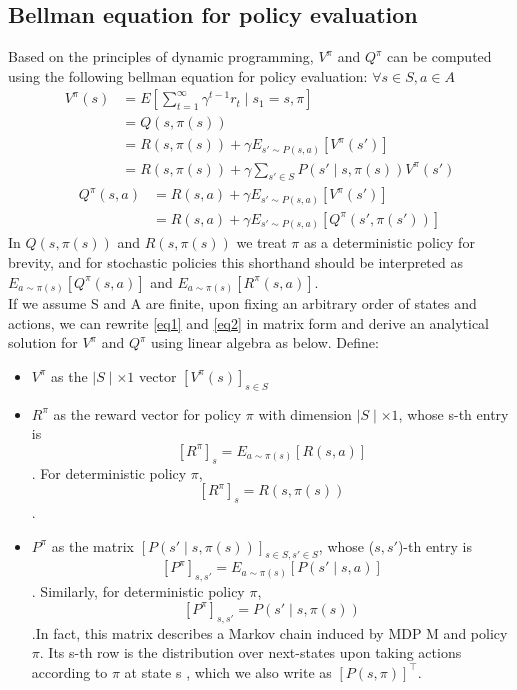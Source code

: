\documentclass{report}
\begin{document}
\subsection{Bellman equation for policy evaluation}
Based on the principles of dynamic programming, $V^{\pi}$ and $Q^{\pi}$ can be computed using the following bellman equation for policy evaluation: $\forall s\in S, a \in A$
\begin{equation} \label{eq1}
\begin{split}
V^{\pi}(s) & = E[\sum_{t=1}^{\infty}\gamma^{t-1}r_t \mid s_1=s,\pi] \\
          & = Q(s, \pi(s)) \\ 
          & = R(s,\pi(s))+\gamma E_{s' \sim P(s,a)}[V^{\pi}(s')] \\
          & = R(s,\pi(s))+\gamma \sum_{s'\in S}P(s' \mid s,\pi(s))V^{\pi}(s') 
\end{split}
\end{equation}
\begin{equation} \label{eq2}
\begin{split}
    Q^{\pi}(s,a) & = R(s,a)+\gamma E_{s'\sim P(s,a)}[V^{\pi}(s')] \\
                & =  R(s,a)+\gamma E_{s'\sim P(s,a)}[Q^{\pi}(s', \pi(s'))]           
\end{split}
\end{equation}
In $Q(s, \pi(s))$ and $R(s,\pi(s))$ we treat $\pi$ as a deterministic policy for brevity, and for stochastic policies this shorthand should be interpreted as $E_{a\sim\pi(s)}[Q^{\pi}(s,a)]$ and $E_{a\sim\pi(s)}[R^{\pi}(s,a)]$.\\
If we assume S and A are finite, upon fixing an arbitrary order of states and actions, we can rewrite \ref{eq1} and \ref{eq2} in matrix form and derive an analytical solution for $V^{\pi}$ and $Q^{\pi}$ using linear algebra as below. Define:
\begin{itemize}
    \item $V^{\pi}$ as the $\mid S\mid \times 1$ vector $[V^{\pi}(s)]_{s\in S}$
    \item $R^{\pi}$ as the reward vector for policy $\pi$ with dimension $\mid S \mid \times 1$, whose s-th entry is \[[R^{\pi}]_s=E_{a\sim\pi(s)}[R(s,a)]\]. For deterministic policy $\pi$, \[
        [R^{\pi}]_s=R(s,\pi(s))
    \].
    \item $P^{\pi}$ as the matrix $[P(s'\mid s,\pi(s))]_{s\in S,s'\in S}$, whose ($s,s'$)-th entry is \[[P^{\pi}]_{s,s'}=E_{a\sim\pi(s)}[P(s'\mid s,a)]\]. Similarly, for deterministic policy $\pi$, \[
        [P^{\pi}]_{s,s'}=P(s'\mid s,\pi(s))
    \].In fact, this matrix describes a Markov chain induced by MDP M and policy $\pi$. Its s-th row is the distribution over next-states upon taking actions according to $\pi$ at state s , which we also write as $[P(s,\pi)]^{\top}$.
\end{itemize}
\end{document}
